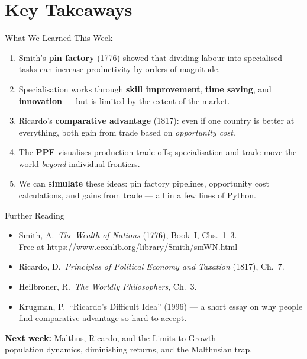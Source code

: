 \documentclass[aspectratio=169, 10pt]{beamer}
\begin{document}
\section{Key Takeaways}

\begin{frame}{What We Learned This Week}
\begin{enumerate}
  \item Smith's \textbf{pin factory} (1776) showed that dividing labour
        into specialised tasks can increase productivity by orders of
        magnitude.
  \item Specialisation works through \textbf{skill improvement},
        \textbf{time saving}, and \textbf{innovation} --- but is
        limited by the extent of the market.
  \item Ricardo's \textbf{comparative advantage} (1817): even if one
        country is better at everything, both gain from trade based
        on \textit{opportunity cost}.
  \item The \textbf{PPF} visualises production trade-offs;
        specialisation and trade move the world \textit{beyond}
        individual frontiers.
  \item We can \textbf{simulate} these ideas: pin factory pipelines,
        opportunity cost calculations, and gains from trade ---
        all in a few lines of Python.
\end{enumerate}
\end{frame}

\begin{frame}{Further Reading}
\begin{itemize}
  \item Smith, A.\ \textit{The Wealth of Nations} (1776), Book~I, Chs.~1--3.\\
        Free at \url{https://www.econlib.org/library/Smith/smWN.html}
  \item Ricardo, D.\ \textit{Principles of Political Economy and Taxation}
        (1817), Ch.~7.
  \item Heilbroner, R.\ \textit{The Worldly Philosophers}, Ch.~3.
  \item Krugman, P.\ ``Ricardo's Difficult Idea'' (1996) --- a short essay
        on why people find comparative advantage so hard to accept.
\end{itemize}
\vspace{1em}
\begin{center}
\textbf{Next week:} Malthus, Ricardo, and the Limits to Growth ---\\
population dynamics, diminishing returns, and the Malthusian trap.
\end{center}
\end{frame}
\end{document}
